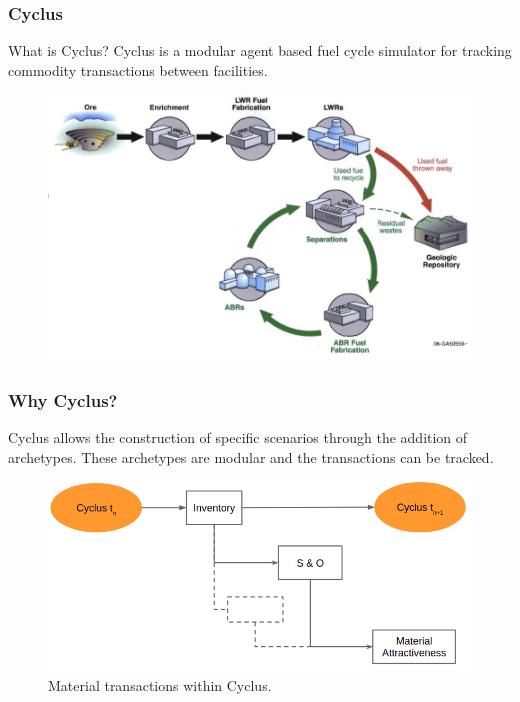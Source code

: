 \begin{frame}
\frametitle{Cyclus}
\begin{block}{What is Cyclus?}
	Cyclus is a modular agent based fuel cycle simulator for tracking commodity transactions
	between facilities.
\end{block}
\begin{figure}
	\centering
	\includegraphics[width=0.7\linewidth]{./images/lanl-fuel-cycle.png}
	\label{fig:fuelcycle}
\end{figure}
\end{frame}

\begin{frame}
\frametitle{Why Cyclus?}
Cyclus allows the construction of specific scenarios through the addition of archetypes. These archetypes are
modular and the transactions can be tracked.
	\begin{figure}
		\centering
		\includegraphics[width=0.9\linewidth]{./images/diversion1}
		\caption{Material transactions within Cyclus.}
		\label{fig:transactions}
	\end{figure}
\end{frame}